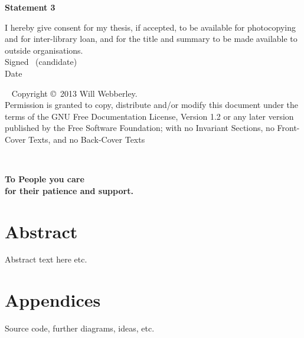 \vfill

\textbf{\large Statement 3}

I hereby give consent for my thesis, if accepted, to be available for photocopying and for inter-library loan,
 and for the title and summary to be made available to outside organisations.\\[2ex]
Signed \dotfill \ (candidate) \hspace*{10em}\\[1ex]
Date\ \ \ \ \ \dotfill \hspace*{18em}

\vfill

\cleardoublepage


\thispagestyle{plain}
\ \vfill{\small
Copyright \copyright\ 2013 Will Webberley.\\
Permission is granted to copy, distribute and/or modify this document
under the terms of the GNU Free Documentation License, Version 1.2 or
any later version published by the Free Software Foundation; with no
Invariant Sections, no Front-Cover Texts, and no Back-Cover Texts}\\[3.5ex]
\cleardoublepage


\ \vspace*{1.11cm}
\begin{flushright}
\textbf{\large To People you care}\\
\textbf{\large for their patience and support.}
\end{flushright}
\newpage
\markboth{}{}
\cleardoublepage


\chapter*{Abstract}
Abstract text here etc.

\tableofcontents

\listoffigures
\listoftables



\mainmatter 








\chapter*{Appendices}
Source code, further diagrams, ideas, etc.

\backmatter

\def\baselinestretch{1.24}\normalfont





